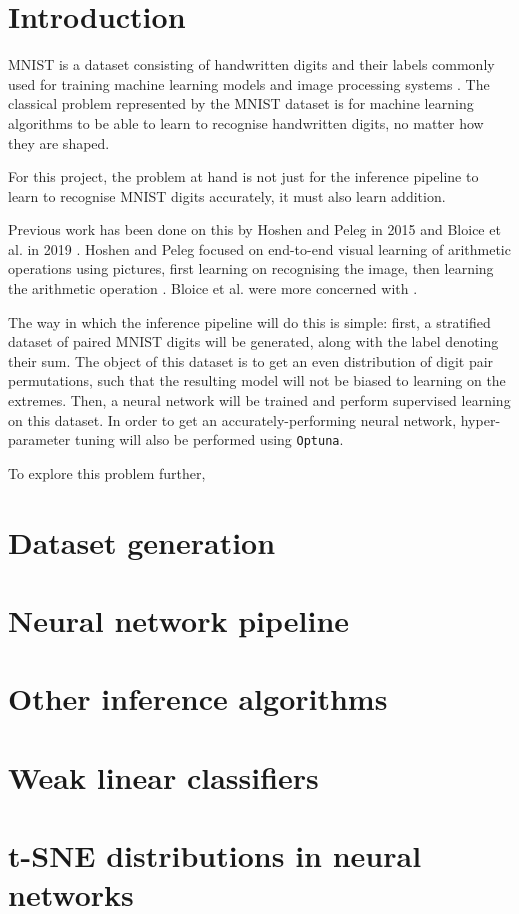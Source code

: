 \documentclass[11pt,a4paper]{article}
\begin{document}
 

\section{Introduction}

MNIST is a dataset consisting of handwritten digits and their labels commonly used for training machine learning models and image processing systems \citep{deng2012mnist}. The classical problem represented by the MNIST dataset is for machine learning algorithms to be able to learn to recognise handwritten digits, no matter how they are shaped.

For this project, the problem at hand is not just for the inference pipeline to learn to recognise MNIST digits accurately, it must also learn addition.

Previous work has been done on this by Hoshen and Peleg in 2015 \citep{hoshen2015visuallearningarithmeticoperations} and Bloice et al. in 2019 \citep{bloice2019performingarithmeticusingneural}. Hoshen and Peleg focused on end-to-end visual learning of arithmetic operations using pictures, first learning on recognising the image, then learning the arithmetic operation \citep{hoshen2015visuallearningarithmeticoperations}. Bloice et al. were more concerned with .


The way in which the inference pipeline will do this is simple: first, a stratified dataset of paired MNIST digits will be generated, along with the label denoting their sum. The object of this dataset is to get an even distribution of digit pair permutations, such that the resulting model will not be biased to learning on the extremes. Then, a neural network will be trained and perform supervised learning on this dataset. In order to get an accurately-performing neural network, hyper-parameter tuning will also be performed using \texttt{Optuna}.

To explore this problem further, 

\section{Dataset generation}

\section{Neural network pipeline}

\section{Other inference algorithms}

\section{Weak linear classifiers}

\section{t-SNE distributions in neural networks}




\end{document}
